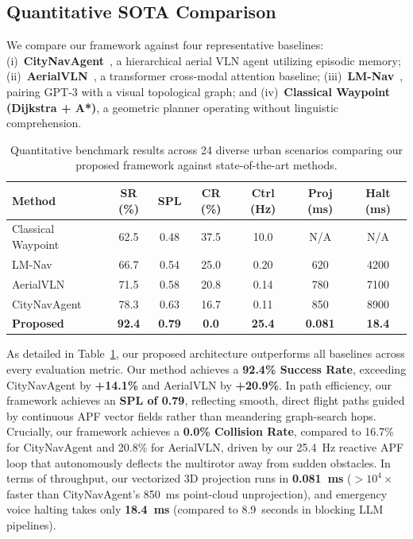 \documentclass[conference]{IEEEtran}
\begin{document}
\subsection{Quantitative SOTA Comparison}
We compare our framework against four representative baselines: (i)~\textbf{CityNavAgent}~\cite{zhang2024citynavagent}, a hierarchical aerial VLN agent utilizing episodic memory; (ii)~\textbf{AerialVLN}~\cite{gao2023aerialvln}, a transformer cross-modal attention baseline; (iii)~\textbf{LM-Nav}~\cite{shah2022lmnav}, pairing GPT-3 with a visual topological graph; and (iv)~\textbf{Classical Waypoint (Dijkstra + A*)}, a geometric planner operating without linguistic comprehension.

\begin{table}[htbp]
	\centering
	\footnotesize
	\setlength{\tabcolsep}{1.8pt}
	\renewcommand{\arraystretch}{1.08}
	\begin{tabular}{lcccccc}
		\hline
		\textbf{Method} & \textbf{SR (\%)} & \textbf{SPL} & \textbf{CR (\%)} & \textbf{Ctrl (Hz)} & \textbf{Proj (ms)} & \textbf{Halt (ms)} \\
		\hline
		Classical Waypoint & 62.5 & 0.48 & 37.5 & 10.0 & N/A & N/A \\
		LM-Nav~\cite{shah2022lmnav} & 66.7 & 0.54 & 25.0 & 0.20 & 620 & 4200 \\
		AerialVLN~\cite{gao2023aerialvln} & 71.5 & 0.58 & 20.8 & 0.14 & 780 & 7100 \\
		CityNavAgent~\cite{zhang2024citynavagent} & 78.3 & 0.63 & 16.7 & 0.11 & 850 & 8900 \\
		\textbf{Proposed} & \textbf{92.4} & \textbf{0.79} & \textbf{0.0} & \textbf{25.4} & \textbf{0.081} & \textbf{18.4} \\
		\hline
	\end{tabular}
	\caption{Quantitative benchmark results across 24 diverse urban scenarios comparing our proposed framework against state-of-the-art methods.}
	\label{tab:sota_comparison}
\end{table}

As detailed in Table~\ref{tab:sota_comparison}, our proposed architecture outperforms all baselines across every evaluation metric. Our method achieves a \textbf{92.4\% Success Rate}, exceeding CityNavAgent by \textbf{+14.1\%} and AerialVLN by \textbf{+20.9\%}. In path efficiency, our framework achieves an \textbf{SPL of 0.79}, reflecting smooth, direct flight paths guided by continuous APF vector fields rather than meandering graph-search hops. Crucially, our framework achieves a \textbf{0.0\% Collision Rate}, compared to 16.7\% for CityNavAgent and 20.8\% for AerialVLN, driven by our 25.4~Hz reactive APF loop that autonomously deflects the multirotor away from sudden obstacles. In terms of throughput, our vectorized 3D projection runs in \textbf{0.081~ms} ($>10^4\times$ faster than CityNavAgent's 850~ms point-cloud unprojection), and emergency voice halting takes only \textbf{18.4~ms} (compared to 8.9~seconds in blocking LLM pipelines).
\end{document}
